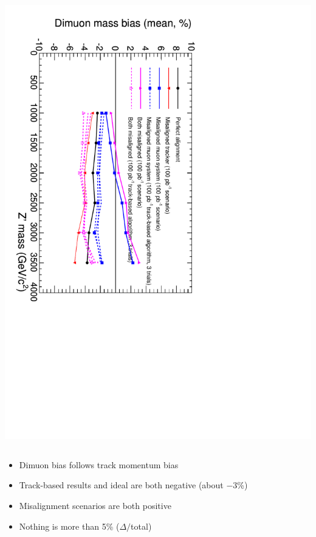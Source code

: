 \documentclass[compress]{beamer}
\begin{document}
\begin{frame}
\begin{columns}
\vspace{-0.25 cm}
\includegraphics[height=1.1\linewidth, angle=90]{ZSSM_Align_MassBiasMean_color-100.pdf}
\end{columns}

\vspace{0.25 cm}
\begin{itemize}
\item Dimuon bias follows track momentum bias
\item Track-based results and ideal are both negative (about $-3$\%)
\item Misalignment scenarios are both positive
\item Nothing is more than 5\% ($\Delta/$total)
\end{itemize}
\end{frame}
\end{document}

